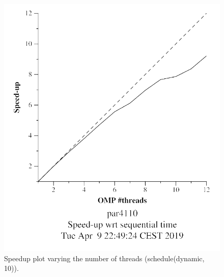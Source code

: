 \documentclass[12pt, a4paper]{article}
\begin{document}
\begin{figure}[H]
\begin{minipage}[b]{0.4\linewidth}
  \includegraphics[scale=0.5]{./mandel-omp-10000-strong-omp-for-dynamic-800-speedup}
  \caption{Speedup plot varying the number of threads (schedule(dynamic, 10)).}
  \label{fig:mandel-omp-10000-strong-omp-for-dynamic-800-speedup}
\end{minipage}
\end{figure}
\end{document}
